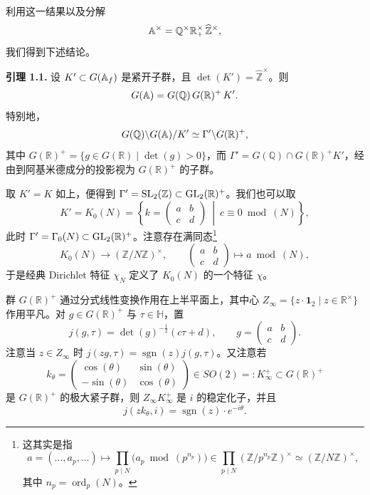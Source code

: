 利用这一结果以及分解
\[
\mathbb{A}^\times=\mathbb{Q}^\times\mathbb{R}^\times_+\,\widehat{\mathbb{Z}}^\times,
\]
我们得到下述结论。

\medskip\noindent\textbf{引理 1.1.}\quad
设 $K'\subset G(\mathbb{A}_f)$ 是紧开子群，且 $\det(K')=\widehat{\mathbb{Z}}^\times$。则
\[
G(\mathbb{A})=G(\mathbb{Q})\,G(\mathbb{R})^+\,K'.
\]
特别地，
\[
G(\mathbb{Q})\backslash G(\mathbb{A})/K'\simeq\Gamma'\backslash G(\mathbb{R})^+,
\]
其中 $G(\mathbb{R})^+=\{g\in G(\mathbb{R})\mid \det(g)>0\}$，而 $\Gamma'=G(\mathbb{Q})\cap G(\mathbb{R})^+K'$，经由到阿基米德成分的投影视为 $G(\mathbb{R})^+$ 的子群。

\medskip
取 $K'=K$ 如上，便得到 $\Gamma'=\mathrm{SL}_2(\mathbb{Z})\subset\mathrm{GL}_2(\mathbb{R})^+$。我们也可以取
\begin{equation*}\tag{1.3}
K'=K_0(N)=\left\{k=\begin{pmatrix}a&b\\c&d\end{pmatrix}\ \middle|\ c\equiv 0\bmod(N)\right\},
\end{equation*}
此时 $\Gamma'=\Gamma_0(N)\subset\mathrm{GL}_2(\mathbb{R})^+$。注意存在满同态\footnote{这其实是指
\[
a=(\dots,a_p,\dots)\mapsto\prod_{p\mid N}\bigl(a_p\bmod(p^{n_p})\bigr)\in\prod_{p\mid N}(\mathbb{Z}/p^{n_p}\mathbb{Z})^\times\simeq(\mathbb{Z}/N\mathbb{Z})^\times,
\]
其中 $n_p=\operatorname{ord}_p(N)$。}
\begin{equation*}\tag{1.4}
K_0(N)\to(\mathbb{Z}/N\mathbb{Z})^\times,\qquad
\begin{pmatrix}a&b\\c&d\end{pmatrix}\mapsto a\bmod(N),
\end{equation*}
于是经典 Dirichlet 特征 $\chi_N$ 定义了 $K_0(N)$ 的一个特征 $\chi$。

群 $G(\mathbb{R})^+$ 通过分式线性变换作用在上半平面上，其中心 $Z_\infty=\{z\cdot\mathbf{1}_2\mid z\in\mathbb{R}^\times\}$ 作用平凡。对 $g\in G(\mathbb{R})^+$ 与 $\tau\in\mathbb{H}$，置
\begin{equation*}\tag{1.5}
j(g,\tau)=\det(g)^{-\frac12}(c\tau+d),\qquad g=\begin{pmatrix}a&b\\c&d\end{pmatrix}.
\end{equation*}
注意当 $z\in Z_\infty$ 时 $j(zg,\tau)=\operatorname{sgn}(z)j(g,\tau)$。又注意若
\begin{equation*}\tag{1.6}
k_\theta=\begin{pmatrix}\cos(\theta)&\sin(\theta)\\-\sin(\theta)&\cos(\theta)\end{pmatrix}\in SO(2)=:K_\infty^+\subset G(\mathbb{R})^+
\end{equation*}
是 $G(\mathbb{R})^+$ 的极大紧子群，则 $Z_\infty K_\infty^+$ 是 $i$ 的稳定化子，并且
\begin{equation*}\tag{1.7}
j(zk_\theta,i)=\operatorname{sgn}(z)\cdot e^{-i\theta}.
\end{equation*}

